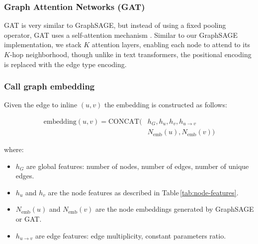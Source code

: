 \documentclass{article}
\theoremstyle{plain}
\theoremstyle{definition}
\theoremstyle{remark}
\begin{document}
\subsubsection{Graph Attention Networks (GAT)}

GAT is very similar to GraphSAGE, but instead of using a fixed pooling operator, GAT uses a self-attention mechanism \cite{gat}. Similar to our GraphSAGE implementation, we stack $K$ attention layers, enabling each node to attend to its $K$-hop neighborhood, though unlike in text transformers, the positional encoding is replaced with the edge type encoding.

\subsubsection{Call graph embedding}


Given the edge to inline $(u, v)$ the embedding is constructed as follows:


{\small
\begin{equation}
\label{equation:embedding}
\begin{split}
    \text{embedding}(u, v) = \text{CONCAT}( & h_G, h_u, h_v, h_{u \rightarrow v} \\
                                            & N_{\text{emb}}(u), N_{\text{emb}}(v))
\end{split}
\end{equation}
}

where:

\begin{itemize}
    \item $h_G$ are global features: number of nodes, number of edges, number of unique edges.
    \item $h_u$ and $h_v$ are the node features as described in Table\,\ref{tab:node-features}.
    \item $N_{\text{emb}}(u)$ and $N_{\text{emb}}(v)$ are the node embeddings generated by GraphSAGE or GAT.
    \item $h_{u \rightarrow v}$ are edge features: edge multiplicity, constant parameters ratio.
\end{itemize}
\end{document}
